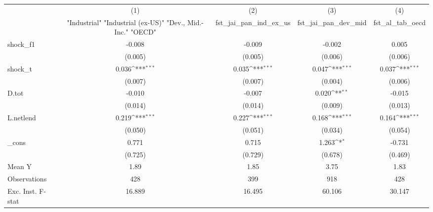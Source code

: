 {
\def\sym#1{\ifmmode^{#1}\else\(^{#1}\)\fi}
\begin{tabular}{l*{4}{c}}
\toprule
            &\multicolumn{1}{c}{(1)}&\multicolumn{1}{c}{(2)}&\multicolumn{1}{c}{(3)}&\multicolumn{1}{c}{(4)}\\
            &\multicolumn{1}{c}{ "Industrial" "Industrial (ex-US)" "Dev., Mid.-Inc." "OECD" }&\multicolumn{1}{c}{fst\_jai\_pan\_ind\_ex\_us}&\multicolumn{1}{c}{fst\_jai\_pan\_dev\_mid}&\multicolumn{1}{c}{fst\_al\_tab\_oecd}\\
\midrule
shock\_f1    &      -0.008         &      -0.009         &      -0.002         &       0.005         \\
            &     (0.005)         &     (0.005)         &     (0.006)         &     (0.006)         \\
\addlinespace
shock\_t     &       0.036\sym{***}&       0.035\sym{***}&       0.047\sym{***}&       0.037\sym{***}\\
            &     (0.007)         &     (0.007)         &     (0.004)         &     (0.006)         \\
\addlinespace
D.tot       &      -0.010         &      -0.007         &       0.020\sym{**} &      -0.015         \\
            &     (0.014)         &     (0.014)         &     (0.009)         &     (0.013)         \\
\addlinespace
L.netlend   &       0.219\sym{***}&       0.227\sym{***}&       0.168\sym{***}&       0.164\sym{***}\\
            &     (0.050)         &     (0.051)         &     (0.034)         &     (0.054)         \\
\addlinespace
\_cons      &       0.771         &       0.715         &       1.263\sym{*}  &      -0.731         \\
            &     (0.725)         &     (0.729)         &     (0.678)         &     (0.469)         \\
\midrule
Mean Y      &        1.89         &        1.85         &        3.75         &        1.83         \\
Observations&         428         &         399         &         918         &         428         \\
Exc. Inst. F-stat&      16.889         &      16.495         &      60.106         &      30.147         \\
\bottomrule
\end{tabular}
}
